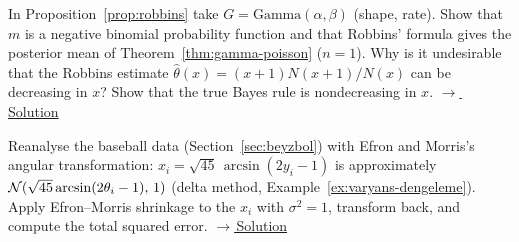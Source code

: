 \documentclass[main.tex]{subfiles}
\begin{document}
\begin{exercise}\label{exr:19-6}
In Proposition~\ref{prop:robbins} take $G=\text{Gamma}(\alpha,\beta)$ (shape, rate). Show that $m$ is a negative binomial probability function and that Robbins' formula gives the posterior mean of Theorem~\ref{thm:gamma-poisson} ($n=1$). Why is it undesirable that the Robbins estimate $\hat\theta(x)=(x+1)N(x+1)/N(x)$ can be decreasing in $x$? Show that the true Bayes rule is nondecreasing in $x$.
\hfill\hyperref[coz:19-6]{\footnotesize$\rightarrow$\,Solution}
\end{exercise}

\begin{exercise}\label{exr:19-7}
Reanalyse the baseball data (Section~\ref{sec:beyzbol}) with Efron and Morris's angular transformation: $x_i=\sqrt{45}\,\arcsin(2y_i-1)$ is approximately $\mathcal{N}(\sqrt{45}\arcsin(2\theta_i-1),\,1)$ (delta method, Example~\ref{ex:varyans-dengeleme}). Apply Efron--Morris shrinkage to the $x_i$ with $\sigma^2=1$, transform back, and compute the total squared error.
\hfill\hyperref[coz:19-7]{\footnotesize$\rightarrow$\,Solution}
\end{exercise}

\end{document}
